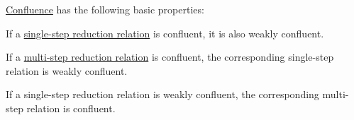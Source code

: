\begin{proposition}\label{thm:def:reduction_confluence}
  \hyperref[def:reduction_confluence]{Confluence} has the following basic properties:
  \begin{thmenum}
     If a \hyperref[def:lambda_term_reduction/single]{single-step reduction relation} is confluent, it is also weakly confluent.

     If a \hyperref[def:lambda_term_reduction/single]{multi-step reduction relation} is confluent, the corresponding single-step relation is weakly confluent.

     If a single-step reduction relation is weakly confluent, the corresponding multi-step relation is confluent.
  \end{thmenum}
\end{proposition}
